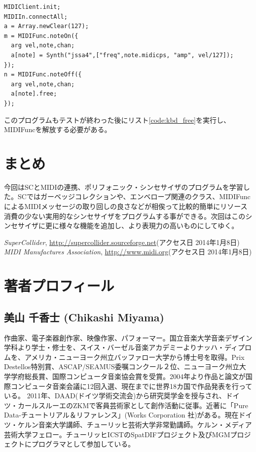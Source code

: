 \documentclass{jsarticle}
\begin{document}
\begin{lstlisting}[caption=ポリフォニック・シンセサイザ,label=code:polyphonic]
MIDIClient.init;
MIDIIn.connectAll;
a = Array.newClear(127);
m = MIDIFunc.noteOn({
  arg vel,note,chan;
  a[note] = Synth("jssa4",["freq",note.midicps, "amp", vel/127]);
});
n = MIDIFunc.noteOff({
  arg vel,note,chan;
  a[note].free;
});
\end{lstlisting}

このプログラムもテストが終わった後にリスト\ref{code:kbd_free}を実行し、MIDIFuncを解放する必要がある。

\section{まとめ}
今回はSCとMIDIの連携、ポリフォニック・シンセサイザのプログラムを学習した。SCではガーベッジコレクションや、エンベロープ関連のクラス、MIDIFuncによるMIDIメッセージの取り回しの良さなどが相俟って比較的簡単にリソース消費の少ない実用的なシンセサイザをプログラムする事ができる。次回はこのシンセサイザに更に様々な機能を追加し、より表現力の高いものにしてゆく。


\begin{thebibliography}{citations}
   {\it SuperCollider}, \url{http://supercollider.sourceforge.net}(アクセス日 2014年1月8日)
   {\it MIDI Manufactures Association}, \url{http://www.midi.org}(アクセス日 2014年1月8日)

\end{thebibliography}

\section{著者プロフィール}
\subsection*{美山 千香士 (Chikashi Miyama)}
作曲家、電子楽器創作家、映像作家、パフォーマー。国立音楽大学音楽デザイン学科より学士・修士を、スイス・バーゼル音楽アカデミーよりナッハ・ディプロムを、アメリカ・ニューヨーク州立バッファロー大学から博士号を取得。Prix Destellos特別賞、ASCAP/SEAMUS委嘱コンクール２位、ニューヨーク州立大学学府総長賞、国際コンピュータ音楽協会賞を受賞。2004年より作品と論文が国際コンピュータ音楽会議に12回入選、現在までに世界18カ国で作品発表を行っている。 2011年、DAAD(ドイツ学術交流会)から研究奨学金を授与され、ドイツ・カールスルーエのZKMで客員芸術家として創作活動に従事。近著に「Pure Data-チュートリアル＆リファレンス」(Works Corporation 社)がある。現在ドイツ・ケルン音楽大学講師、チューリッヒ芸術大学非常勤講師。ケルン・メディア芸術大学フェロー。チューリッヒICSTのSpatDIFプロジェクト及びMGMプロジェクトにプログラマとして参加している。
\end{document}
